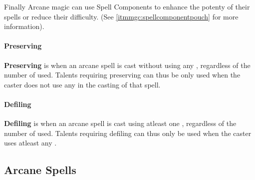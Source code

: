 \begin{multicols}{2}
Finally Arcane magic can use Spell Components to enhance the potenty of their spells
or reduce their difficulty. (See \cref{itmmgc:spellcomponentpouch} for more information).

\paragraph{Preserving}
\textbf{Preserving} is when an arcane spell is cast without using any \dark, regardless of the number of \light used.
Talents requiring preserving can thus be only used when the caster does not use any \dark in the casting of that spell.

\paragraph{Defiling}
\textbf{Defiling} is when an arcane spell is cast using atleast one \dark, regardless of the number of \light used.
Talents requiring defiling can thus only be used when the caster uses atleast any \dark.

\end{multicols}

\hrulefill

\begin{multicols}{2}
\subsection{Arcane Spells}






\end{multicols}

\FloatBarrier
\hrulefill

